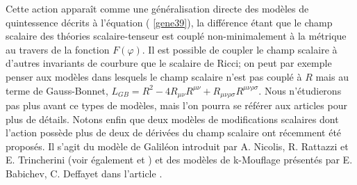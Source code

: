 \documentclass[a4paper,12pt]{report}
\theoremstyle{plain}
\theoremstyle{plain}
\begin{document}
Cette action appara\^it comme une g\'en\'eralisation directe des mod\`eles de quintessence d\'ecrits
\`a l'\'equation ( \ref{gene39}), la diff\'erence \'etant que le champ scalaire des th\'eories scalaire-tenseur est
coupl\'e non-minimalement \`a la m\'etrique au travers de la fonction $F(\varphi )$. Il est possible de
coupler le champ scalaire \`a d'autres invariants de courbure que le scalaire de Ricci; on peut
par exemple penser aux mod\`eles dans lesquels le champ scalaire n'est pas coupl\'e \`a $R$ mais
au terme de Gauss-Bonnet, $ L_{GB} = R^2 - 4R_{ \mu \nu}R^{\mu \nu } + R_{ \mu \nu \rho \sigma} R^{\mu \nu \rho \sigma }$. Nous n'\'etudierons pas
plus avant ce types de mod\`eles, mais l'on pourra se r\'ef\'erer aux articles \cite{9, 10, 175, 176, 183}
pour plus de d\'etails. Notons enfin que deux mod\`eles de modifications scalaires dont l'action
poss\`ede plus de deux de d\'eriv\'ees du champ scalaire ont r\'ecemment \'et\'e propos\'es. Il s'agit
du mod\`ele de Galil\'eon introduit par A. Nicolis, R. Rattazzi et E. Trincherini \cite{203} (voir
\'egalement \cite{94, 97} et \cite{ 249}) et des mod\`eles de k-Mouflage pr\'esent\'es par E. Babichev, C.
Deffayet  dans l'article \cite{27}.

% 
\end{document}
